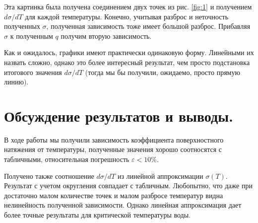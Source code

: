 \documentclass[a4paper,12pt]{report}
\begin{document}
    \begin{multicols}{2}
        Эта картинка была получена соединением двух точек из рис. \ref{fig:1} и получением $d\sigma/dT$ для каждой температуры. Конечно, учитывая разброс и неточность полученных $\sigma$, полученная зависимость тоже имеет большой разброс. Прибавляя $\sigma$ к полученным $q$ получим вторую зависимость.

        Как и ожидалось, графики имеют практически одинаковую форму. Линейными их назвать сложно, однако это более интересный результат, чем просто подстановка итогового значения $d\sigma/dT$ (тогда мы бы получили, ожидаемо, просто прямую линию).

        \newcolumn

        \section{Обсуждение результатов и выводы.}

        В ходе работы мы получили зависимость коэффициента поверхностного натяжения от температуры, полученные значения хорошо соотносятся с табличными, относительная погрешность $\varepsilon<10\%$.

        Получено также соотношение $d\sigma/dT$ из линейной аппроксимации $\sigma(T)$. Результат с учетом округления совпадает с табличным. Любопытно, что даже при достаточно малом количестве точек и малом разбросе температур видна нелинейность полученной зависимости. Однако линейная аппроксимация дает более точные результаты для критической температуры воды.


    \end{multicols}
\end{document}
